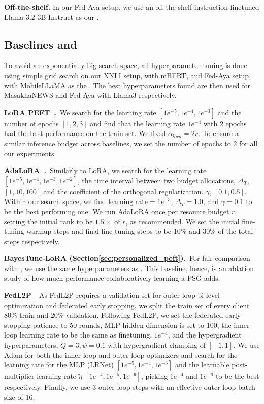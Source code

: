 \noindent\textbf{Off-the-shelf.} In our Fed-Aya setup, we use an off-the-shelf instruction finetuned Llama-3.2-3B-Instruct as our \basemodel{}.

\subsection{Baselines and \method{}}

To avoid an exponentially big search space, all hyperparameter tuning is done using simple grid search on our XNLI setup, with mBERT, and Fed-Aya setup, with MobileLLaMA as the \basemodel{}. The best hyperparameters found are then used for MasakhaNEWS and Fed-Aya with Llama3 respectively.

\noindent\textbf{LoRA PEFT~\cite{hu2021lora}.}~We search for the learning rate $[1e^{-5},1e^{-4},1e^{-3}]$ and the number of epochs $[1,2,3]$ and find that the learning rate $1e^{-4}$ with $2$ epochs had the best performance on the train set. We fixed $\alpha_{lora}=2r$. To ensure a similar inference budget across baselines, we set the number of epochs to $2$ for all our experiments.

\noindent\textbf{AdaLoRA~\cite{adalora}.}~Similarly to LoRA, we search for the learning rate $[1e^{-5},1e^{-4},1e^{-3},1e^{-2}]$, the time interval between two budget allocations, $\Delta_T$, $[1,10,100]$ and the coefficient of the orthogonal regularization, $\gamma$, $[0.1,0.5]$. Within our search space, we find learning rate$=1e^{-3}$, $\Delta_T=1.0$, and $\gamma=0.1$ to be the best performing one. We run AdaLoRA once per resource budget $r$, setting the initial rank to be $1.5\times$ of $r$, as recommended. We set the initial fine-tuning warmup steps and final fine-tuning steps to be $10\%$ and $30\%$ of the total steps respectively. 

\noindent\textbf{BayesTune-LoRA (Section\ref{sec:personalized_peft}).}~For fair comparison with \method{}, we use the same hyperparameters as \method{}. This baseline, hence, is an ablation study of how much performance collaboratively learning a PSG adds.

\noindent\textbf{FedL2P~\cite{royson2023fedl2p}}~As FedL2P requires a validation set for outer-loop bi-level optimization and federated early stopping, we split the train set of every client $80\%$ train and $20\%$ validation. Following FedL2P, we set the federated early stopping patience to 50 rounds, MLP hidden dimension is set to 100, the inner-loop learning rate to be the same as finetuning, $1e^{-4}$, and the hypergradient hyperparameters, $Q=3, \psi=0.1$ with hypergradient clamping of $[-1,1]$. 
We use Adam for both the inner-loop and outer-loop optimizers and search for the learning rate for the MLP (LRNet) $[1e^{-5},1e^{-4},1e^{-3}]$ and the learnable post-multiplier learning rate $\tilde{\eta}$ $[1e^{-4},1e^{-5},1e^{-6}]$, picking $1e^{-4}$ and $1e^{-6}$ to be the best respectively. Finally, we use $3$ outer-loop steps with an effective outer-loop batch size of $16$.

